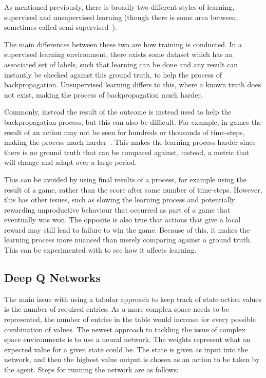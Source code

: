 As mentioned previously, there is broadly two different styles of learning,
supervised and unsupervised learning (though there is some area between,
sometimes called semi-supervised~\cite{chapelle2009semi}).

The main differences between these two are how training is conducted. In a
supervised learning environment, there exists some dataset which has an
associated set of labels, such that learning can be done and any result can
instantly be checked against this ground truth, to help the process of
backpropagation. Unsupervised learning differs to this, where a known truth
does not exist, making the process of backpropagation much harder.

Commonly, instead the result of the outcome is instead used to help the
backpropagation process, but this can also be difficult. For example,
in games the result of an action may not be seen for hundreds or thousands
of time-steps, making the process much harder~\cite{sutton1984temporal}.
This makes the learning process harder since there is no ground truth
that can be compared against, instead, a metric that will change and adapt
over a large period.

This can be avoided by using final results of a process, for example using the
result of a game, rather than the score after some number of time-steps.
However, this has other issues, such as slowing the learning process and
potentially rewarding unproductive behaviour that occurred as part of a game
that eventually was won. The opposite is also true that actions that give a
local reward may still lead to failure to win the game. Because of this, it
makes the learning process more nuanced than merely comparing against a ground
truth. This can be experimented with to see how it affects learning.

\subsection{Deep Q Networks}

The main issue with using a tabular approach to keep track of state-action
values is the number of required entries. As a more complex space needs to be
represented, the number of entries in the table would increase for every
possible combination of values. The newest approach to tackling the issue of
complex space environments is to use a neural network. The weights represent
what an expected value for a given state could be. The state is given as input
into the network, and then the highest value output is chosen as an action to be
taken by the agent. Steps for running the network are as follows:

